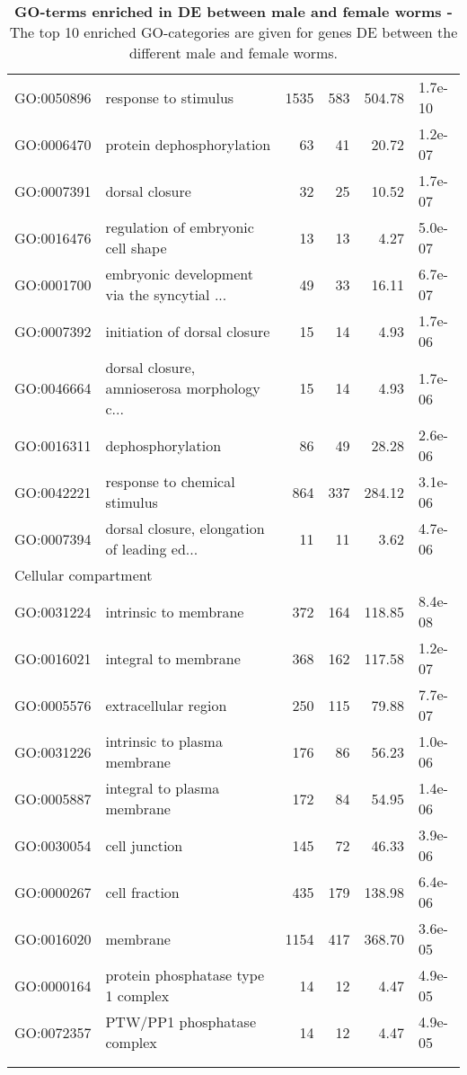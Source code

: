\begin{longtable}{lp{4cm}rrrl}
  GO:0050896 & response to stimulus & 1535 & 583 & 504.78 & 1.7e-10 \\ 
  GO:0006470 & protein dephosphorylation &  63 &  41 & 20.72 & 1.2e-07 \\ 
  GO:0007391 & dorsal closure &  32 &  25 & 10.52 & 1.7e-07 \\ 
  GO:0016476 & regulation of embryonic cell shape &  13 &  13 & 4.27 & 5.0e-07 \\ 
  GO:0001700 & embryonic development via the syncytial ... &  49 &  33 & 16.11 & 6.7e-07 \\ 
  GO:0007392 & initiation of dorsal closure &  15 &  14 & 4.93 & 1.7e-06 \\ 
  GO:0046664 & dorsal closure, amnioserosa morphology c... &  15 &  14 & 4.93 & 1.7e-06 \\ 
  GO:0016311 & dephosphorylation &  86 &  49 & 28.28 & 2.6e-06 \\ 
  GO:0042221 & response to chemical stimulus & 864 & 337 & 284.12 & 3.1e-06 \\ 
  GO:0007394 & dorsal closure, elongation of leading ed... &  11 &  11 & 3.62 & 4.7e-06 \\ 
  \hline
  \multicolumn{6}{l}{Cellular compartment}  \\ 
  GO:0031224 & intrinsic to membrane & 372 & 164 & 118.85 & 8.4e-08 \\ 
  GO:0016021 & integral to membrane & 368 & 162 & 117.58 & 1.2e-07 \\ 
  GO:0005576 & extracellular region & 250 & 115 & 79.88 & 7.7e-07 \\ 
  GO:0031226 & intrinsic to plasma membrane & 176 &  86 & 56.23 & 1.0e-06 \\ 
  GO:0005887 & integral to plasma membrane & 172 &  84 & 54.95 & 1.4e-06 \\ 
  GO:0030054 & cell junction & 145 &  72 & 46.33 & 3.9e-06 \\ 
  GO:0000267 & cell fraction & 435 & 179 & 138.98 & 6.4e-06 \\ 
  GO:0016020 & membrane & 1154 & 417 & 368.70 & 3.6e-05 \\ 
  GO:0000164 & protein phosphatase type 1 complex &  14 &  12 & 4.47 & 4.9e-05 \\ 
  GO:0072357 & PTW/PP1 phosphatase complex &  14 &  12 & 4.47 & 4.9e-05 \\ 
  \hline\\
\caption[GO-terms enriched in DE between male and
female]{\textbf{GO-terms enriched in DE between male and female worms
    -} The top 10 enriched GO-categories are given for genes DE
  between the different male and female worms.}
\label{func-sex}
\end{longtable}

